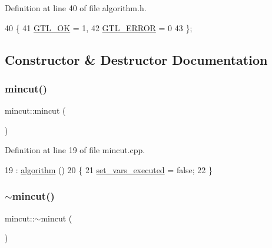 Definition at line 40 of file algorithm.\+h.


\begin{DoxyCode}
40          \{
41     \mbox{\hyperlink{classalgorithm_af1a0078e153aa99c24f9bdf0d97f6710a5114c20e4a96a76b5de9f28bf15e282b}{GTL\_OK}} = 1,
42     \mbox{\hyperlink{classalgorithm_af1a0078e153aa99c24f9bdf0d97f6710a6fcf574690bbd6cf710837a169510dd7}{GTL\_ERROR}} = 0
43     \};
\end{DoxyCode}


\subsection{Constructor \& Destructor Documentation}
\mbox{\label{classmincut_a9761193cdb9c6f3f675d70fb0ef3afc8}} 
\subsubsection{\texorpdfstring{mincut()}{mincut()}}
{\footnotesize\ttfamily mincut\+::mincut (\begin{DoxyParamCaption}{ }\end{DoxyParamCaption})}



Definition at line 19 of file mincut.\+cpp.


\begin{DoxyCode}
19                 : \mbox{\hyperlink{classalgorithm_ab79e1ddec2f2afdf4b36b10724db8b15}{algorithm}} () 
20 \{
21     \mbox{\hyperlink{classmincut_adeef2b186f863ce70809a6731f09de04}{set\_vars\_executed}} = \textcolor{keyword}{false};
22 \}
\end{DoxyCode}
\mbox{\label{classmincut_a2d02e194571b58604409eeb7edf46438}} 
\subsubsection{\texorpdfstring{$\sim$mincut()}{~mincut()}}
{\footnotesize\ttfamily mincut\+::$\sim$mincut (\begin{DoxyParamCaption}{ }\end{DoxyParamCaption})\hspace{0.3cm}{\ttfamily [virtual]}}



